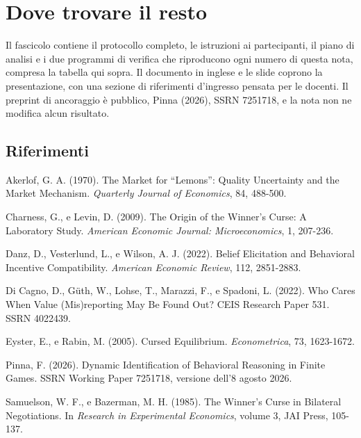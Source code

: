 \documentclass[11pt,a4paper]{article}
\begin{document}
\section{Dove trovare il resto}

Il fascicolo contiene il protocollo completo, le istruzioni ai partecipanti, il piano di analisi e i due programmi di verifica che riproducono ogni numero di questa nota, compresa la tabella qui sopra. Il documento in inglese e le slide coprono la presentazione, con una sezione di riferimenti d'ingresso pensata per le docenti. Il preprint di ancoraggio \`e pubblico, Pinna (2026), SSRN 7251718, e la nota non ne modifica alcun risultato.

\subsection*{Riferimenti}

\begin{list}{}{\setlength{\itemsep}{2pt}\setlength{\leftmargin}{1.5em}}
\item Akerlof, G. A. (1970). The Market for ``Lemons'': Quality Uncertainty and the Market Mechanism. \emph{Quarterly Journal of Economics}, 84, 488-500.
\item Charness, G., e Levin, D. (2009). The Origin of the Winner's Curse: A Laboratory Study. \emph{American Economic Journal: Microeconomics}, 1, 207-236.
\item Danz, D., Vesterlund, L., e Wilson, A. J. (2022). Belief Elicitation and Behavioral Incentive Compatibility. \emph{American Economic Review}, 112, 2851-2883.
\item Di Cagno, D., G\"uth, W., Lohse, T., Marazzi, F., e Spadoni, L. (2022). Who Cares When Value (Mis)reporting May Be Found Out? CEIS Research Paper 531. SSRN 4022439.
\item Eyster, E., e Rabin, M. (2005). Cursed Equilibrium. \emph{Econometrica}, 73, 1623-1672.
\item Pinna, F. (2026). Dynamic Identification of Behavioral Reasoning in Finite Games. SSRN Working Paper 7251718, versione dell'8 agosto 2026.
\item Samuelson, W. F., e Bazerman, M. H. (1985). The Winner's Curse in Bilateral Negotiations. In \emph{Research in Experimental Economics}, volume 3, JAI Press, 105-137.
\end{list}
\end{document}
